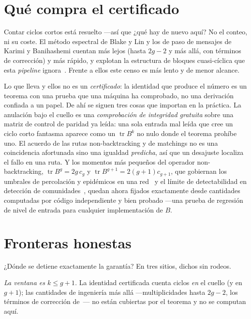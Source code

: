 \documentclass[11pt]{article}
\DeclareMathOperator{\tr}{tr}
\begin{document}
\section{Qué compra el certificado}
\label{sec:buys}

Contar ciclos cortos está resuelto ---así que ¿qué hay de nuevo aquí? No el conteo, ni su
coste. El método espectral de Blake y Lin y los de paso de mensajes de Karimi y Banihashemi
cuentan más lejos (hasta $2g-2$ y más allá, con términos de corrección) y más rápido, y
explotan la estructura de bloques cuasi-cíclica que esta \emph{pipeline}
ignora~\cite{BlakeLin2018,KarimiBanihashemi2013,Dehghan2018}. Frente a ellos este censo es
más lento y de menor alcance.

Lo que lleva y ellos no es un \emph{certificado}: la identidad que produce el número es un
teorema con una prueba que una máquina ha comprobado, no una derivación confiada a un papel.
De ahí se siguen tres cosas que importan en la práctica. La anulación bajo el cuello es una
\emph{comprobación de integridad gratuita} sobre una matriz de control de paridad ya leída:
una sola entrada mal leída que cree un ciclo corto fantasma aparece como un $\tr B^k$ no nulo
donde el teorema prohíbe uno. El acuerdo de las rutas non-backtracking y de matchings no es
una coincidencia afortunada sino una igualdad \emph{predicha}, así que un desajuste localiza
el fallo en una ruta. Y los momentos más pequeños del operador non-backtracking,
$\tr B^g = 2g\,c_g$ y $\tr B^{g+1} = 2(g{+}1)c_{g+1}$, que gobiernan los umbrales de
percolación y epidémicos en una red~\cite{KarrerNewman2014} y el límite de detectabilidad en
detección de comunidades~\cite{Krzakala2013}, quedan ahora fijados exactamente desde
cantidades computadas por código independiente y bien probado ---una prueba de regresión de
nivel de entrada para cualquier implementación de $B$.

\section{Fronteras honestas}
\label{sec:boundary}

¿Dónde se detiene exactamente la garantía? En tres sitios, dichos sin rodeos.

\emph{La ventana es $k \le g+1$.} La identidad certificada cuenta ciclos \emph{en} el cuello
(y en $g+1$); las cantidades de ingeniería más allá ---multiplicidades hasta $2g-2$, los
términos de corrección de~\cite{BlakeLin2018,Dehghan2018}--- no están cubiertas por el
teorema y no se computan aquí.
\end{document}
